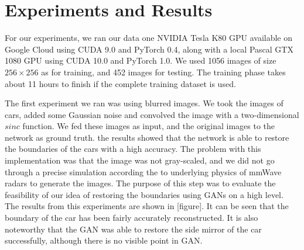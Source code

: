 \section{ Experiments and Results} \label{experiment}
For our experiments, we ran our data one NVIDIA Tesla K80 GPU available on Google Cloud using CUDA 9.0 and PyTorch 0.4, along with a local Pascal GTX 1080 GPU using CUDA 10.0 and PyTorch 1.0. We used 1056 images of size $256 \times 256$ as for training, and 452 images for testing. The training phase takes about 11 hours to finish if the complete training dataset is used.

The first experiment we ran was using blurred images. We took the images of cars, added some Gaussian noise and convolved the image with a two-dimensional $sinc$ function. We fed these images as input, and the original images to the network as ground truth. the results showed that the network is able to restore the boundaries of the cars with a high accuracy. The problem with this implementation was that the image was not gray-scaled, and we did not go through a precise simulation according the to underlying physics of mmWave radars to generate the images. The purpose of this step was to evaluate the feasibility of our idea of restoring the boundaries using GANs on a high level. The results from this experiments are shown in [figure]. It can be seen that the boundary of the car has been fairly accurately reconstructed. It is also noteworthy that the GAN was able to restore the side mirror of the car successfully, although there is no visible point in GAN. 

